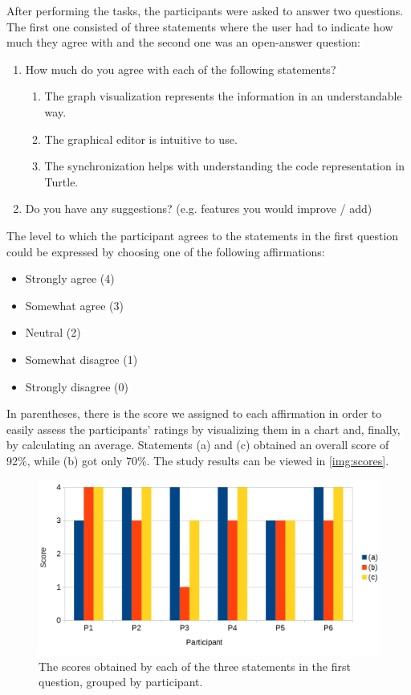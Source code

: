 After performing the tasks, the participants were asked to answer two questions. The first one consisted of three statements where the user had to indicate how much they agree with and the second one was an open-answer question:

\begin{enumerate}
	\item How much do you agree with each of the following statements?
	\begin{enumerate}
		\item The graph visualization represents the information in an understandable way.
		\item The graphical editor is intuitive to use.
		\item The synchronization helps with understanding the code representation in Turtle.
	\end{enumerate}
	\item Do you have any suggestions? (e.g. features you would improve / add)
\end{enumerate}

The level to which the participant agrees to the statements in the first question could be expressed by choosing one of the following affirmations:

\begin{itemize}
	\item Strongly agree (4)
	\item Somewhat agree (3)
	\item Neutral (2)
	\item Somewhat disagree (1)
	\item Strongly disagree (0)
\end{itemize}

In parentheses, there is the score we assigned to each affirmation in order to easily assess the participants' ratings by visualizing them in a chart and, finally, by calculating an average. Statements (a) and (c) obtained an overall score of 92\%, while (b) got only 70\%. The study results can be viewed in \autoref{img:scores}.

\begin{figure}[htb]
	\centering
  	\centerline{\includegraphics[width = \textwidth]{img/scores.png}}
	\caption{The scores obtained by each of the three statements in the first question, grouped by participant.}
	\label{img:scores}
\end{figure}

